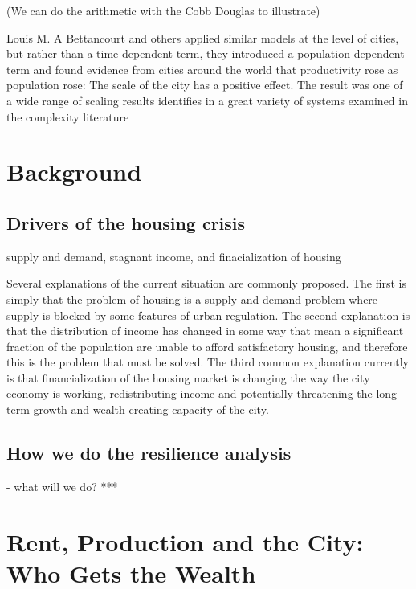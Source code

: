 (We can do the arithmetic with the Cobb Douglas to illustrate)

Louis M. A Bettancourt and others applied similar models at the level of cities, but rather than a time-dependent term, they introduced a population-dependent term and found evidence from cities around the world that productivity rose as population rose: The scale of the city has a positive effect. The result  was one of a wide range of scaling results identifies in a great variety of systems examined in the complexity literature 


\section{Background}

\subsection{Drivers of the housing crisis}
supply and demand, stagnant income, and finacialization of housing

Several explanations of the current situation are commonly proposed. The first is simply that the problem of housing is a supply and demand problem where supply is blocked by some features of urban regulation. The second explanation is that the distribution of income has changed in some way that mean a significant fraction of the population are unable to afford satisfactory housing, and therefore this is the problem that must be solved.  The third common explanation currently is that financialization of the housing market  is changing the way the city economy is working, redistributing income and potentially threatening the long term growth and wealth creating capacity of the city.


\subsection{How we do the resilience analysis}

- what will we do? *** 



\section{Rent, Production and the City: Who Gets the Wealth}



